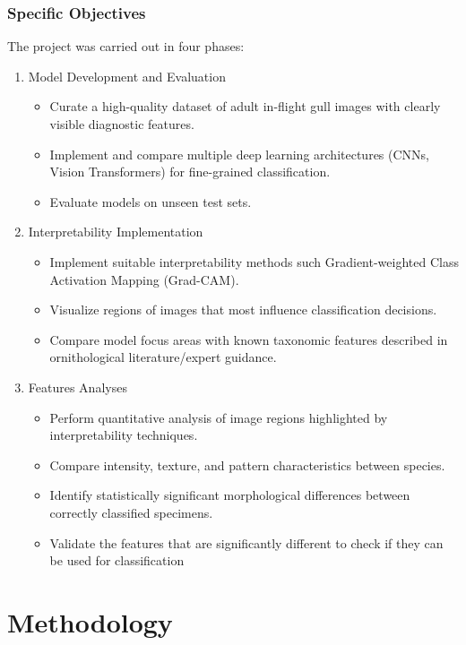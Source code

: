 \documentclass[a4paper,12pt]{report}
\begin{document}
\subsection*{Specific Objectives}
The project was carried out in four phases:
\begin{enumerate}
    \item Model Development and Evaluation
        \begin{itemize}
            \item Curate a high-quality dataset of adult in-flight gull images with clearly visible diagnostic features.
            \item Implement and compare multiple deep learning architectures (CNNs, Vision Transformers) for fine-grained classification.
            \item Evaluate models on unseen test sets.
        \end{itemize}
    \item Interpretability Implementation
        \begin{itemize}
            \item Implement suitable interpretability methods such Gradient-weighted Class Activation Mapping (Grad-CAM).
            \item Visualize regions of images that most influence classification decisions.
            \item Compare model focus areas with known taxonomic features described in ornithological literature/expert guidance.
        \end{itemize}
    \item Features Analyses
        \begin{itemize}
            \item Perform quantitative analysis of image regions highlighted by interpretability techniques.
            \item Compare intensity, texture, and pattern characteristics between species.
            \item Identify statistically significant morphological differences between correctly classified specimens.
            \item Validate the features that are significantly different to check if they can be used for classification
        \end{itemize}
\end{enumerate}


\newpage
\chapter{Methodology}
\end{document}
